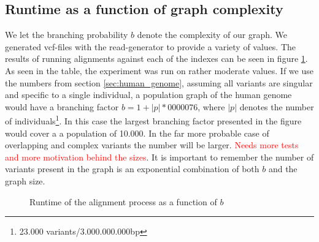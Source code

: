 \documentclass[thesis.tex]{subfiles}
\begin{document}
\subsection*{Runtime as a function of graph complexity}
\label{sec:runtime_complexity}
We let the branching probability $b$ denote the complexity of our graph. We generated vcf-files with the read-generator to provide a variety of values. The results of running alignments against each of the indexes can be seen in figure \ref{fig:runtime_b}. As seen in the table, the experiment was run on rather moderate values. If we use the numbers from section \ref{sec:human_genome}, assuming all variants are singular and specific to a single individual, a population graph of the human genome would have a branching factor $b=1+|p|*0000076$, where $|p|$ denotes the number of individuals\footnote{23.000 variants/3.000.000.000bp}. In this case the largest branching factor presented in the figure would cover a a population of 10.000. In the far more probable case of overlapping and complex variants the number will be larger. \textcolor{red}{Needs more tests and more motivation behind the sizes}. It is important to remember the number of variants present in the graph is an exponential combination of both $b$ and the graph size.
\begin{figure}[!hb]
  \caption{Runtime of the alignment process as a function of $b$}
  \label{fig:runtime_b}
\end{figure}
\clearpage
\end{document}
